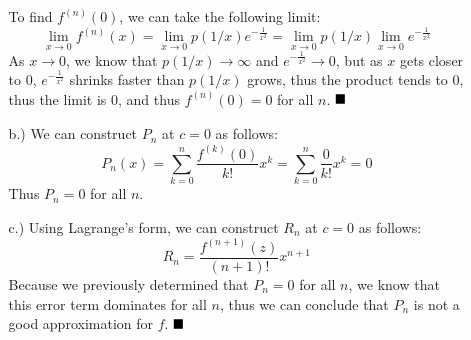 \documentclass[11pt]{article}
\newcommand{\lm}[1]{\displaystyle\lim_{#1}}
\begin{document}
\begin{itemize}
\begin{itemize}
        \pagebreak
        To find $f^{(n)}(0)$, we can take the following limit:
        \[\lm{x\to0}f^{(n)}(x)=\lm{x\to0}p(1/x)e^{-\frac{1}{x^2}}=\lm{x\to0}p(1/x)\lm{x\to0}e^{-\frac{1}{x^2}}\]
        As $x\to0$, we know that $p(1/x)\to\infty$ and $e^{-\frac{1}{x^2}}\to0$, but as $x$ gets closer to $0$, $e^{-\frac{1}{x^2}}$ shrinks faster than $p(1/x)$ grows, thus the product tends to $0$, thus the limit is $0$, and thus $f^{(n)}(0)=0$ for all $n$.
        $\newline\strut\hfill\blacksquare$

        \item [b.)] We can construct $P_n$ at $c=0$ as follows:
        \[P_n(x)=\sum_{k=0}^n\frac{f^{(k)}(0)}{k!}x^k=\sum_{k=0}^n\frac{0}{k!}x^k=0\]
        Thus $P_n=0$ for all $n$.

        \item [c.)] Using Lagrange's form, we can construct $R_n$ at $c=0$ as follows:
        \[R_n=\frac{f^{(n+1)}(z)}{(n+1)!}x^{n+1}\]
        Because we previously determined that $P_n=0$ for all $n$, we know that this error term dominates for all $n$, thus we can conclude that $P_n$ is not a good approximation for $f$.
        $\newline\strut\hfill\blacksquare$
    \end{itemize}
\end{itemize}
\end{document}
